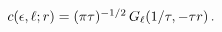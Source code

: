 $\mathop{c\/}\nolimits\!\left(\epsilon,\ell;r\right)=(\pi\tau)^{-1/2}\mathop{G_%
{\ell}\/}\nolimits\!\left(1/\tau,-\tau r\right).$